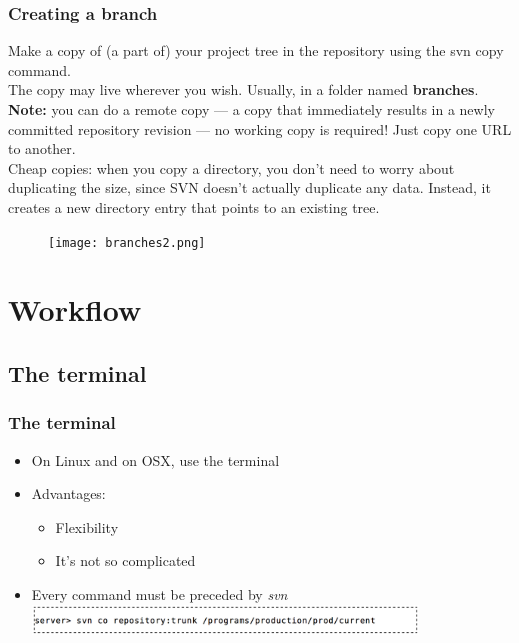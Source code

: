 \documentclass{beamer}
\begin{document}
\frame
{
	\frametitle{Creating a branch}
	Make a copy of (a part of) your project tree in the repository using the \alert{svn copy} command. \\
	\medskip
	The copy may live wherever you wish. Usually, in a folder named \textbf{branches}.\\
	\medskip
	\textbf{Note:} you can do a \alert{remote copy} --- a copy that immediately results in a newly committed repository revision --- no working copy is required! 	Just copy one URL to another.\\
	\medskip
	\alert{Cheap copies:} when you copy a directory, you don't need to worry about duplicating the size, since SVN doesn't actually duplicate any data. Instead, it creates a new directory entry that points to an existing tree.



}

\frame
{
	\begin{figure}[H]
	\centering
	\texttt{[image: branches2.png]}
	\end{figure}


}

\section{Workflow}


\subsection{The terminal}

\frame
{
  \frametitle{The terminal}
  
  \begin{itemize}
  \item<1-> On Linux and on OSX, use the terminal
  \item<2-> Advantages:
  	\begin{itemize}
	\item<1-> Flexibility
	\item<2-> It's not so complicated
	\end{itemize}
  \item<3-> Every command must be preceded by \textit{svn}
  \includegraphics[height=0.8cm]{svn_example.png}
  \end{itemize}
	
}
\end{document}
